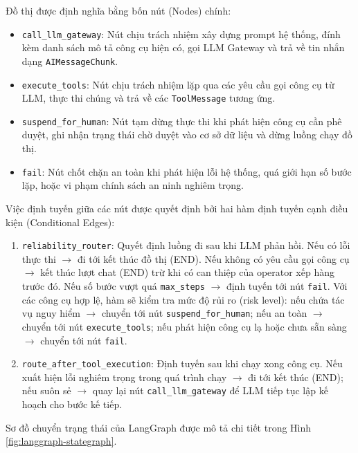 \documentclass[12pt,a4paper]{article}
\begin{document}
Đồ thị được định nghĩa bằng bốn nút (Nodes) chính:
\begin{itemize}
    \item \texttt{call\_llm\_gateway}: Nút chịu trách nhiệm xây dựng prompt hệ thống, đính kèm danh sách mô tả công cụ hiện có, gọi LLM Gateway và trả về tin nhắn dạng \texttt{AIMessageChunk}.
    \item \texttt{execute\_tools}: Nút chịu trách nhiệm lặp qua các yêu cầu gọi công cụ từ LLM, thực thi chúng và trả về các \texttt{ToolMessage} tương ứng.
    \item \texttt{suspend\_for\_human}: Nút tạm dừng thực thi khi phát hiện công cụ cần phê duyệt, ghi nhận trạng thái chờ duyệt vào cơ sở dữ liệu và dừng luồng chạy đồ thị.
    \item \texttt{fail}: Nút chốt chặn an toàn khi phát hiện lỗi hệ thống, quá giới hạn số bước lặp, hoặc vi phạm chính sách an ninh nghiêm trọng.
\end{itemize}

Việc định tuyến giữa các nút được quyết định bởi hai hàm định tuyến cạnh điều kiện (Conditional Edges):
\begin{enumerate}
    \item \texttt{reliability\_router}: Quyết định luồng đi sau khi LLM phản hồi. Nếu có lỗi thực thi $\to$ đi tới kết thúc đồ thị (END). Nếu không có yêu cầu gọi công cụ $\to$ kết thúc lượt chat (END) trừ khi có can thiệp của operator xếp hàng trước đó. Nếu số bước vượt quá \texttt{max\_steps} $\to$ định tuyến tới nút \texttt{fail}. Với các công cụ hợp lệ, hàm sẽ kiểm tra mức độ rủi ro (risk level): nếu chứa tác vụ nguy hiểm $\to$ chuyển tới nút \texttt{suspend\_for\_human}; nếu an toàn $\to$ chuyển tới nút \texttt{execute\_tools}; nếu phát hiện công cụ lạ hoặc chưa sẵn sàng $\to$ chuyển tới nút \texttt{fail}.
    \item \texttt{route\_after\_tool\_execution}: Định tuyến sau khi chạy xong công cụ. Nếu xuất hiện lỗi nghiêm trọng trong quá trình chạy $\to$ đi tới kết thúc (END); nếu suôn sẻ $\to$ quay lại nút \texttt{call\_llm\_gateway} để LLM tiếp tục lập kế hoạch cho bước kế tiếp.
\end{enumerate}

Sơ đồ chuyển trạng thái của LangGraph được mô tả chi tiết trong Hình \ref{fig:langgraph-stategraph}.
\end{document}
